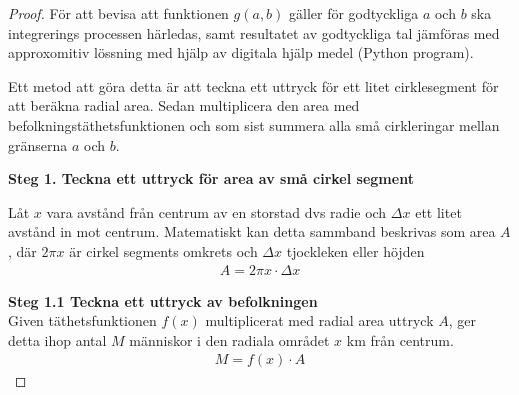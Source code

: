 \documentclass{article}
\begin{document}
\begin{proof}
För att bevisa att funktionen \( g(a,b) \) gäller för godtyckliga \( a \) och \(
b \) ska integrerings processen härledas, samt resultatet av godtyckliga tal
jämföras med approxomitiv lössning med hjälp av digitala hjälp medel (Python
program).

Ett metod att göra detta är att teckna ett uttryck för ett litet cirklesegment för
att beräkna radial area. Sedan multiplicera den area med
befolkningstäthetsfunktionen och som sist summera alla små cirkleringar mellan
gränserna \( a \) och \( b \).

\textbf{Steg 1. Teckna ett uttryck för area av små cirkel segment} \\
	\begin{figure}[h]
	\centering
	\label{fig:summa}
	\end{figure}
Låt \( x \) vara avstånd från centrum av en storstad dvs radie och \( \Delta x
\) ett litet avstånd in mot centrum. Matematiskt kan detta sammband beskrivas
som area \( A \),  där \( 2 \pi x \) är cirkel segments omkrets och \( \Delta x
\) tjockleken eller höjden 
\begin{align*}
	A = 2\pi x \cdot \Delta x
\end{align*}

\textbf{Steg 1.1 Teckna ett uttryck av befolkningen} \\
Given täthetsfunktionen \( f(x) \) multiplicerat med radial area uttryck \( A
\), ger detta ihop antal \( M \) människor  i den radiala området \( x \) km från
centrum.
\begin{align*}
	M = f(x) \cdot A
\end{align*}


\end{proof}
\end{document}
